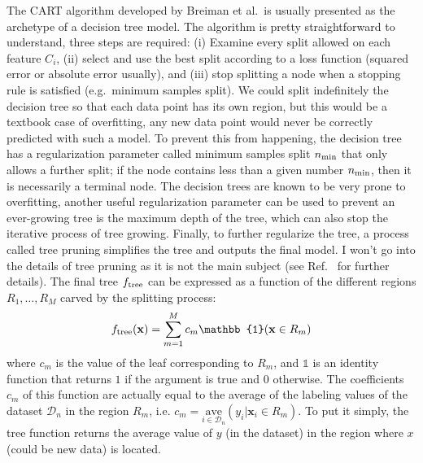 \documentclass[main]{subfiles}
\begin{document}
The CART\autocite{Breiman_2017} algorithm developed by Breiman et al.\ is usually presented as the archetype of a decision tree model. The algorithm is pretty straightforward to understand, three steps are required: (i) Examine every split allowed on each feature $C_i$, (ii) select and use the best split according to a loss function (squared error or absolute error usually), and (iii) stop splitting a node when a stopping rule is satisfied (e.g.\ minimum samples split).\autocite{Dension_1998} We could split indefinitely the decision tree so that each data point has its own region, but this would be a textbook case of overfitting, any new data point would never be correctly predicted with such a model. To prevent this from happening, the decision tree has a regularization parameter called minimum samples split $n_{\text{min}}$ that only allows a further split; if the node contains less than a given number $n_{\text{min}}$, then it is necessarily a terminal node. The decision trees are known to be very prone to overfitting, another useful regularization parameter can be used to prevent an ever-growing tree is the maximum depth of the tree,  which can also stop the iterative process of tree growing. Finally, to further regularize the tree, a process called tree pruning simplifies the tree and outputs the final model. I won't go into the details of tree pruning as it is not the main subject (see Ref.~\cite{Hastie_2009} for further details). The final tree $f_{\text{tree}}$ can be expressed as a function of the different regions $R_1,\ldots,R_M$ carved by the splitting process:
\begin{equation}
  f\e{tree}(\mathbf{x}) = \sum_{m=1}^M c_m \mathbb{1}(\mathbf{x}\in R_m)
\end{equation}
where $c_m$ is the value of the leaf corresponding to $R_m$, and $\mathbb{1}$ is an identity function that returns $1$ if the argument is true and $0$ otherwise. The coefficients $c_m$ of this function are actually equal to the average of the labeling values of the dataset $\mathcal{D}_n$ in the region $R_m$, i.e. $c_m= \underset{i\in \mathcal{D}_n}{\text{ave}}(y_i|\mathbf{x}_i\in R_m)$.
To put it simply, the tree function returns the average value of $y$ (in the dataset) in the region where $x$ (could be new data) is located. 
\end{document}
